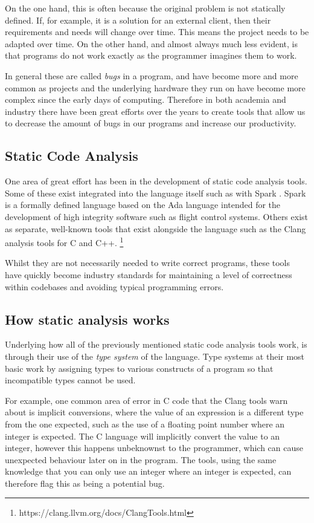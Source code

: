 \documentclass{l4proj}
\begin{document}
On the one hand, this is often because the original problem is not statically defined.
If, for example, it is a solution for an external client, then their requirements and needs will change over time.
This means the project needs to be adapted over time.
On the other hand, and almost always much less evident, is that programs do not work exactly as the programmer imagines them to work.

In general these are called \emph{bugs} in a program, and have become more and more common as projects and the underlying hardware they run on have become more complex since the early days of computing.
Therefore in both academia and industry there have been great efforts over the years to create tools that allow us to decrease the amount of bugs in our programs and increase our productivity.

\subsection{Static Code Analysis}

One area of great effort has been in the development of static code analysis tools.
Some of these exist integrated into the language itself such as with Spark \citep{Carre1990}.
Spark is a formally defined language based on the Ada \citep{Ada1979} language intended for the development of high integrity software such as flight control systems.
Others exist as separate, well-known tools that exist alongside the language such as the Clang analysis tools for C and C++. \footnote{https://clang.llvm.org/docs/ClangTools.html}

Whilst they are not necessarily needed to write correct programs, these tools have quickly become industry standards for maintaining a level of correctness within codebases and avoiding typical programming errors.

\subsection{How static analysis works}

Underlying how all of the previously mentioned static code analysis tools work, is through their use of the \emph{type system} of the language.
Type systems at their most basic work by assigning types to various constructs of a program so that incompatible types cannot be used.

For example, one common area of error in C code that the Clang tools warn about is implicit conversions, where the value of an expression is a different type from the one expected, such as the use of a floating point number where an integer is expected.
The C language will implicitly convert the value to an integer, however this happens unbeknownst to the programmer, which can cause unexpected behaviour later on in the program.
The tools, using the same knowledge that you can only use an integer where an integer is expected, can therefore flag this as being a potential bug.
\end{document}
